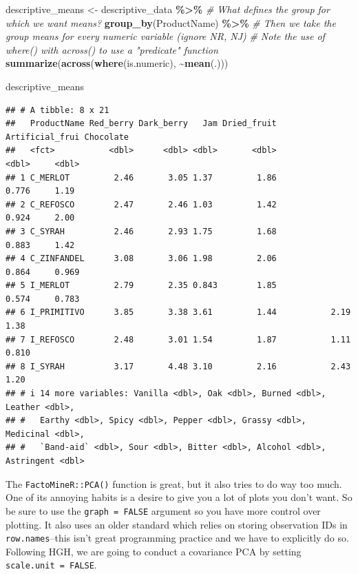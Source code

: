 \documentclass[
]{book}
\newenvironment{Shaded}{\begin{snugshade}}{\end{snugshade}}
\newcommand{\CommentTok}[1]{\textcolor[rgb]{0.56,0.35,0.01}{\textit{#1}}}
\newcommand{\FunctionTok}[1]{\textcolor[rgb]{0.13,0.29,0.53}{\textbf{#1}}}
\newcommand{\NormalTok}[1]{#1}
\newcommand{\OtherTok}[1]{\textcolor[rgb]{0.56,0.35,0.01}{#1}}
\newcommand{\SpecialCharTok}[1]{\textcolor[rgb]{0.81,0.36,0.00}{\textbf{#1}}}
\begin{document}
\begin{Shaded}
\begin{Highlighting}[]
\NormalTok{descriptive\_means }\OtherTok{\textless{}{-}}
\NormalTok{  descriptive\_data }\SpecialCharTok{\%\textgreater{}\%}
  \CommentTok{\# What defines the group for which we want means?}
  \FunctionTok{group\_by}\NormalTok{(ProductName) }\SpecialCharTok{\%\textgreater{}\%}
  \CommentTok{\# Then we take the group means for every numeric variable (ignore NR, NJ)}
  \CommentTok{\# Note the use of where() with across() to use a "predicate" function}
  \FunctionTok{summarize}\NormalTok{(}\FunctionTok{across}\NormalTok{(}\FunctionTok{where}\NormalTok{(is.numeric), }\SpecialCharTok{\textasciitilde{}}\FunctionTok{mean}\NormalTok{(.)))}

\NormalTok{descriptive\_means}
\end{Highlighting}
\end{Shaded}

\begin{verbatim}
## # A tibble: 8 x 21
##   ProductName Red_berry Dark_berry   Jam Dried_fruit Artificial_frui Chocolate
##   <fct>           <dbl>      <dbl> <dbl>       <dbl>           <dbl>     <dbl>
## 1 C_MERLOT         2.46       3.05 1.37         1.86           0.776     1.19 
## 2 C_REFOSCO        2.47       2.46 1.03         1.42           0.924     2.00 
## 3 C_SYRAH          2.46       2.93 1.75         1.68           0.883     1.42 
## 4 C_ZINFANDEL      3.08       3.06 1.98         2.06           0.864     0.969
## 5 I_MERLOT         2.79       2.35 0.843        1.85           0.574     0.783
## 6 I_PRIMITIVO      3.85       3.38 3.61         1.44           2.19      1.38 
## 7 I_REFOSCO        2.48       3.01 1.54         1.87           1.11      0.810
## 8 I_SYRAH          3.17       4.48 3.10         2.16           2.43      1.20 
## # i 14 more variables: Vanilla <dbl>, Oak <dbl>, Burned <dbl>, Leather <dbl>,
## #   Earthy <dbl>, Spicy <dbl>, Pepper <dbl>, Grassy <dbl>, Medicinal <dbl>,
## #   `Band-aid` <dbl>, Sour <dbl>, Bitter <dbl>, Alcohol <dbl>, Astringent <dbl>
\end{verbatim}

The \texttt{FactoMineR::PCA()} function is great, but it also tries to do way too much. One of its annoying habits is a desire to give you a lot of plots you don't want. So be sure to use the \texttt{graph\ =\ FALSE} argument so you have more control over plotting. It also uses an older standard which relies on storing observation IDs in \texttt{row.names}--this isn't great programming practice and we have to explicitly do so. Following HGH, we are going to conduct a covariance PCA by setting \texttt{scale.unit\ =\ FALSE}.
\end{document}
